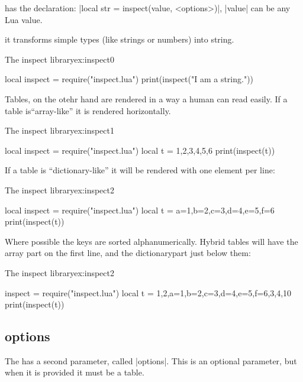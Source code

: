  has the declaration: |local str = inspect(value, <options>)|, |value| can be any Lua value.

 it transforms simple types (like strings or numbers) into string.

\begin{texexample}{The inspect library}{ex:inspect0}
\begin{luacode}
local inspect = require("inspect.lua")
print(inspect("I am a string."))
\end{luacode}
\end{texexample}

Tables, on the otehr hand are rendered in a way a human can read easily. If a table is\enquote{array-like} it is rendered horizontally.

\begin{texexample}{The inspect library}{ex:inspect1}
\begin{luacode}
local inspect = require("inspect.lua")
local t = {1,2,3,4,5,6}
print(inspect(t))
\end{luacode}
\end{texexample}

If a table is \enquote{dictionary-like} it will be rendered with one element per line:

\begin{texexample}{The inspect library}{ex:inspect2}
\begin{luacode}
local inspect = require("inspect.lua")
local t = {a=1,b=2,c=3,d=4,e=5,f=6}
print(inspect(t))
\end{luacode}
\end{texexample}

Where possible the keys are sorted alphanumerically. Hybrid tables will have the array part on the first line, and the dictionarypart just below them:

\begin{texexample}{The inspect library}{ex:inspect2}
\begin{luacode}
inspect = require("inspect.lua")
local t = {1,2,a=1,b=2,c=3,d=4,e=5,f=6,3,4,10}
print(inspect(t))
\end{luacode}
\end{texexample}

\subsection*{options}

The  has a second parameter, called |options|. This is an optional parameter, but when it is 
provided it must be a table.

